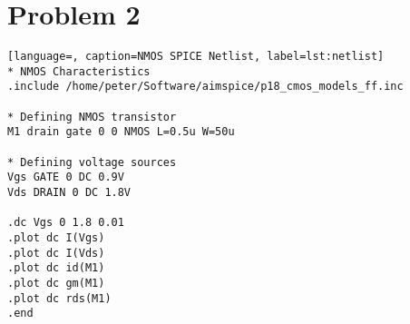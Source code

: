 \section{Problem 2}

\begin{lstlisting}[language=, caption=NMOS SPICE Netlist, label=lst:netlist]
* NMOS Characteristics
.include /home/peter/Software/aimspice/p18_cmos_models_ff.inc

* Defining NMOS transistor
M1 drain gate 0 0 NMOS L=0.5u W=50u

* Defining voltage sources
Vgs GATE 0 DC 0.9V
Vds DRAIN 0 DC 1.8V

.dc Vgs 0 1.8 0.01
.plot dc I(Vgs)
.plot dc I(Vds)
.plot dc id(M1)
.plot dc gm(M1)
.plot dc rds(M1)
.end
\end{lstlisting}
    